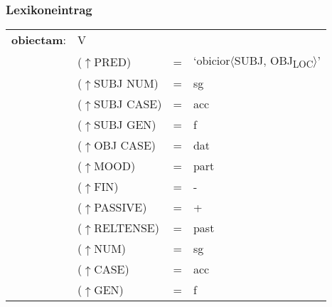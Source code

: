 \documentclass[12pt,a4paper]{article}
\begin{document}
\subsubsection{Lexikoneintrag}
\begin{singlespace}
\begin{tabular}{ l  l  l  l  } 
\textbf{obiectam}: &  \: V \\
$\qquad$ & \:  ($\uparrow$PRED) & = & `obicior$\langle$SUBJ, OBJ\textsubscript{LOC}$\rangle$'\\
$\qquad$ & \:  ($\uparrow$SUBJ NUM) & = & sg \\
$\qquad$ & \: ($\uparrow$SUBJ CASE) & = & acc \\
$\qquad$ & \: ($\uparrow$SUBJ GEN) & = & f \\
$\qquad$ & \: ($\uparrow$OBJ CASE) & = & dat \\
$\qquad$ & \:  ($\uparrow$MOOD) & = & part\\
$\qquad$ & \:  ($\uparrow$FIN) & = & - \\
$\qquad$ & \:  ($\uparrow$PASSIVE) & = & + \\
$\qquad$ & \:  ($\uparrow$RELTENSE) & = & past \\
$\qquad$ & \:  ($\uparrow$NUM) & = & sg \\
$\qquad$ & \: ($\uparrow$CASE) & = & acc \\
$\qquad$ & \: ($\uparrow$GEN) & = & f \\
\end{tabular}
\newline
\end{singlespace}
\end{document}
